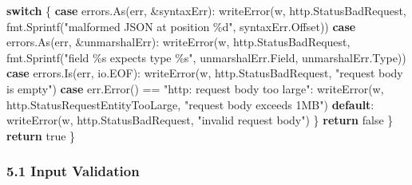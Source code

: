 \documentclass[
]{article}
\newenvironment{Shaded}{}{}
\newcommand{\ControlFlowTok}[1]{\textcolor[rgb]{0.00,0.44,0.13}{\textbf{#1}}}
\newcommand{\NormalTok}[1]{#1}
\newcommand{\OperatorTok}[1]{\textcolor[rgb]{0.40,0.40,0.40}{#1}}
\newcommand{\OtherTok}[1]{\textcolor[rgb]{0.00,0.44,0.13}{#1}}
\newcommand{\StringTok}[1]{\textcolor[rgb]{0.25,0.44,0.63}{#1}}
\begin{document}
\begin{Shaded}
\begin{Highlighting}[]
        \ControlFlowTok{switch} \OperatorTok{\{}
        \ControlFlowTok{case}\NormalTok{ errors}\OperatorTok{.}\NormalTok{As}\OperatorTok{(}\NormalTok{err}\OperatorTok{,} \OperatorTok{\&}\NormalTok{syntaxErr}\OperatorTok{):}
\NormalTok{            writeError}\OperatorTok{(}\NormalTok{w}\OperatorTok{,}\NormalTok{ http}\OperatorTok{.}\NormalTok{StatusBadRequest}\OperatorTok{,}
\NormalTok{                fmt}\OperatorTok{.}\NormalTok{Sprintf}\OperatorTok{(}\StringTok{"malformed JSON at position \%d"}\OperatorTok{,}\NormalTok{ syntaxErr}\OperatorTok{.}\NormalTok{Offset}\OperatorTok{))}
        \ControlFlowTok{case}\NormalTok{ errors}\OperatorTok{.}\NormalTok{As}\OperatorTok{(}\NormalTok{err}\OperatorTok{,} \OperatorTok{\&}\NormalTok{unmarshalErr}\OperatorTok{):}
\NormalTok{            writeError}\OperatorTok{(}\NormalTok{w}\OperatorTok{,}\NormalTok{ http}\OperatorTok{.}\NormalTok{StatusBadRequest}\OperatorTok{,}
\NormalTok{                fmt}\OperatorTok{.}\NormalTok{Sprintf}\OperatorTok{(}\StringTok{"field \textquotesingle{}\%s\textquotesingle{} expects type \%s"}\OperatorTok{,}\NormalTok{ unmarshalErr}\OperatorTok{.}\NormalTok{Field}\OperatorTok{,}\NormalTok{ unmarshalErr}\OperatorTok{.}\NormalTok{Type}\OperatorTok{))}
        \ControlFlowTok{case}\NormalTok{ errors}\OperatorTok{.}\NormalTok{Is}\OperatorTok{(}\NormalTok{err}\OperatorTok{,}\NormalTok{ io}\OperatorTok{.}\NormalTok{EOF}\OperatorTok{):}
\NormalTok{            writeError}\OperatorTok{(}\NormalTok{w}\OperatorTok{,}\NormalTok{ http}\OperatorTok{.}\NormalTok{StatusBadRequest}\OperatorTok{,} \StringTok{"request body is empty"}\OperatorTok{)}
        \ControlFlowTok{case}\NormalTok{ err}\OperatorTok{.}\NormalTok{Error}\OperatorTok{()} \OperatorTok{==} \StringTok{"http: request body too large"}\OperatorTok{:}
\NormalTok{            writeError}\OperatorTok{(}\NormalTok{w}\OperatorTok{,}\NormalTok{ http}\OperatorTok{.}\NormalTok{StatusRequestEntityTooLarge}\OperatorTok{,} \StringTok{"request body exceeds 1MB"}\OperatorTok{)}
        \ControlFlowTok{default}\OperatorTok{:}
\NormalTok{            writeError}\OperatorTok{(}\NormalTok{w}\OperatorTok{,}\NormalTok{ http}\OperatorTok{.}\NormalTok{StatusBadRequest}\OperatorTok{,} \StringTok{"invalid request body"}\OperatorTok{)}
        \OperatorTok{\}}
        \ControlFlowTok{return} \OtherTok{false}
    \OperatorTok{\}}
    \ControlFlowTok{return} \OtherTok{true}
\OperatorTok{\}}
\end{Highlighting}
\end{Shaded}

\hypertarget{input-validation}{%
\subsubsection{5.1 Input Validation}\label{input-validation}}
\end{document}
